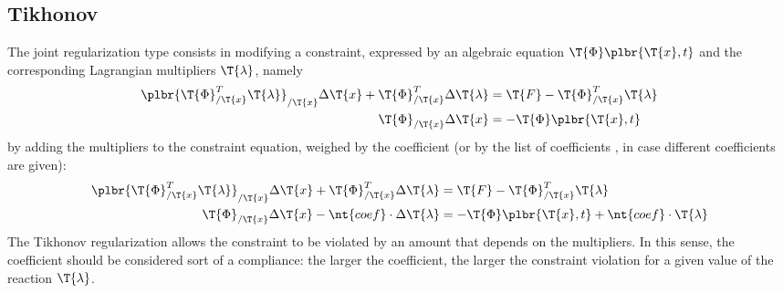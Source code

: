 \subsection{Tikhonov}
The  joint regularization type consists in modifying
a constraint, expressed by an algebraic equation $\T{\Phi}\plbr{\T{x}, t}$
and the corresponding Lagrangian multipliers $\T{\lambda}$, namely
\begin{align}
	\plbr{\T{\Phi}_{/\T{x}}^T \T{\lambda}}_{/\T{x}} \Delta\T{x}
	+ \T{\Phi}_{/\T{x}}^T \Delta\T{\lambda}
		&= \T{F} - \T{\Phi}_{/\T{x}}^T \T{\lambda} \\
	\T{\Phi}_{/\T{x}} \Delta\T{x} &= - \T{\Phi}\plbr{\T{x}, t}
\end{align}
by adding the multipliers to the constraint equation,
weighed by the coefficient  (or by the list of coefficients
, in case different coefficients are given):
\begin{align}
	\plbr{\T{\Phi}_{/\T{x}}^T \T{\lambda}}_{/\T{x}} \Delta\T{x}
	+ \T{\Phi}_{/\T{x}}^T \Delta\T{\lambda}
	&= \T{F} - \T{\Phi}_{/\T{x}}^T \T{\lambda} \\
	\T{\Phi}_{/\T{x}} \Delta\T{x}
	- \nt{coef} \cdot \Delta\T{\lambda}
	&= - \T{\Phi}\plbr{\T{x}, t} + \nt{coef} \cdot \T{\lambda}
\end{align}
The Tikhonov regularization allows the constraint to be violated
by an amount that depends on the multipliers.
In this sense, the coefficient  should be considered
sort of a compliance: the larger the coefficient,
the larger the constraint violation for a given value
of the reaction $\T{\lambda}$.


